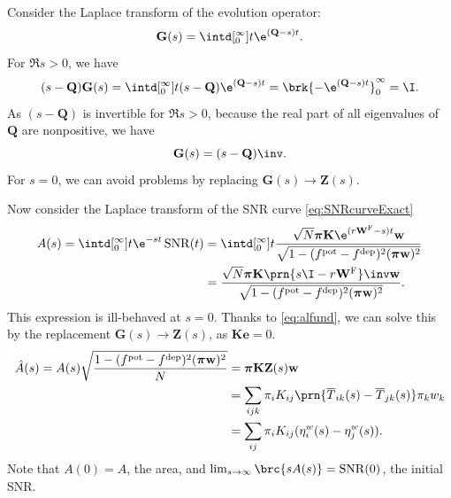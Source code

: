 \documentclass[12pt]{article}
\newcommand{\onev}{\mathbf{e}}
\newcommand{\MMm}{Q}
\newcommand{\MM}{\mathbf{\MMm}}
\newcommand{\eqm}{\pi}
\newcommand{\eq}{\boldsymbol{\eqm}}
\newcommand{\fptm}{T}
\newcommand{\fptbm}{\overline{\fptm}}
\newcommand{\fundm}{Z}
\newcommand{\fund}{\mathbf{\fundm}}
\newcommand{\etwm}{\eta^w}
\newcommand{\wm}{w}
\newcommand{\w}{\mathbf{\wm}}
\newcommand{\Wm}{W}
\newcommand{\W}{\mathbf{\Wm}}
\newcommand{\encm}{K}
\newcommand{\enc}{\mathbf{\encm}}
\newcommand{\frg}{\W^{\mathrm{F}}}
\newcommand{\pot}{^{\text{pot}}}
\newcommand{\dep}{^{\text{dep}}}
\DeclareMathOperator{\SNR}{SNR}
\begin{document}
Consider the Laplace transform of the evolution operator:
%
\begin{equation}\label{eq:levol}
  \mathbf{G}(s) = \intd[_0^{\infty}]{t} \e^{(\MM-s) t}.
\end{equation}
%
For \(\Re s>0\), we have
%
\begin{equation}\label{eq:levolcalc}
  (s-\MM)\mathbf{G}(s) = \intd[_0^{\infty}]{t} (s-\MM)\e^{(\MM-s) t} = \brk{-\e^{(\MM-s) t}}_0^{\infty} = \I.
\end{equation}
%
As \((s-\MM)\) is invertible for \(\Re s>0\), because the real part of all eigenvalues of \(\MM\) are nonpositive, we have
%
\begin{equation}\label{eq:levolres}
  \mathbf{G}(s) = (s-\MM)\inv.
\end{equation}
%
For \(s=0\), we can avoid problems by replacing \(\mathbf{G}(s) \to \fund(s)\).

Now consider the Laplace transform of the SNR curve \eqref{eq:SNRcurveExact}
%
\begin{equation}\label{eq:lsnr}
\begin{aligned}
  A(s) = \intd[_0^{\infty}]{t} \e^{-st}\SNR(t) 
   &= \intd[_0^{\infty}]{t} \frac{ \sqrt{N} \eq \enc \e^{(r\frg-s)t} \w }
                                { \sqrt{1-(f\pot-f\dep)^2(\eq\w)^2} } \\
   &= \frac{\sqrt{N} \eq \enc \prn{s \I - r\frg}\inv \w }{\sqrt{1-(f\pot-f\dep)^2(\eq\w)^2}}.
\end{aligned}
\end{equation}
%
This expression is ill-behaved at \(s=0\).
Thanks to \eqref{eq:alfund}, we can solve this by the replacement \(\mathbf{G}(s) \to \fund(s)\), as \(\enc\onev=0\).
%
\begin{equation}\label{eq:larea}
\begin{aligned}
  \hat{A}(s) = A(s) \sqrt{\frac{{{1-(f\pot-f\dep)^2(\eq\w)^2}}}{N}}  &=  \eq \enc \fund(s) \w \\
    &= \sum_{ijk} \eqm_i \encm_{ij} \prn{\fptbm_{ik}(s)-\fptbm_{jk}(s)} \eqm_k \wm_k \\
    &= \sum_{ij}  \eqm_i \encm_{ij} (\etwm_{i}(s) - \etwm_{j}(s)).
\end{aligned}
\end{equation}
%
Note that \(A(0)=A\), the area, and \(\lim_{s\to\infty} \brc{sA(s)} = \SNR(0)\), the initial SNR.
\end{document}
